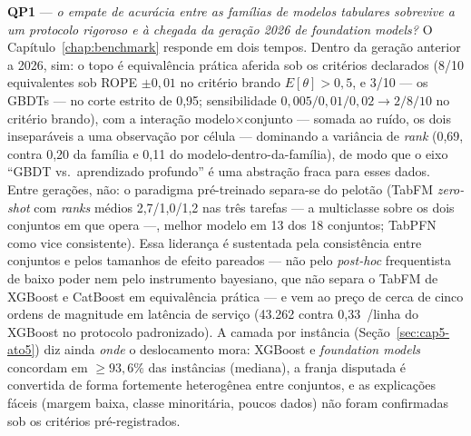 \textbf{QP1} --- \emph{o empate de acurácia entre
as famílias de modelos tabulares sobrevive a um protocolo rigoroso e à
chegada da geração 2026 de foundation models?} O
Capítulo~\ref{chap:benchmark} responde em
dois tempos. Dentro da geração anterior a 2026, sim: o topo é
equivalência prática aferida sob os critérios declarados (8/10 equivalentes sob ROPE
$\pm0{,}01$ no critério brando $E[\theta]>0{,}5$, e 3/10 --- os
GBDTs --- no corte estrito de 0,95; sensibilidade
$0{,}005/0{,}01/0{,}02 \to 2/8/10$ no
critério brando), com a interação modelo$\times$conjunto ---
somada ao ruído, os dois inseparáveis a uma observação por
célula --- dominando a variância de \emph{rank} (0,69, contra 0,20
da família e
0,11 do modelo-dentro-da-família), de modo que o eixo ``GBDT vs.\
aprendizado profundo'' é uma abstração fraca para esses dados. Entre
gerações, não: o
paradigma pré-treinado separa-se do pelotão (TabFM \emph{zero-shot}
com \emph{ranks}
médios 2,7/1,0/1,2 nas três tarefas --- a multiclasse sobre os dois
conjuntos em que opera ---, melhor modelo em 13 dos 18
conjuntos; TabPFN como vice consistente). Essa liderança é
sustentada pela consistência entre conjuntos e pelos tamanhos de
efeito pareados --- não pelo \emph{post-hoc} frequentista de baixo
poder nem pelo instrumento bayesiano, que não separa o TabFM de
XGBoost e CatBoost em equivalência prática --- e vem ao preço de
cerca de
cinco ordens de magnitude em latência de serviço (43.262 contra
0,33~\us/linha do XGBoost no protocolo padronizado). A
camada por instância (Seção~\ref{sec:cap5-ato5}) diz ainda \emph{onde}
o deslocamento mora: XGBoost e \emph{foundation models} concordam em
${\ge}93{,}6\%$ das instâncias (mediana), a franja disputada é
convertida de forma fortemente heterogênea entre conjuntos, e as
explicações fáceis (margem baixa, classe minoritária, poucos dados)
não foram confirmadas sob os critérios pré-registrados.


